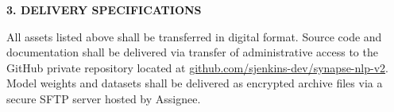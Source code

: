 \vspace{1.5em}

\noindent\textbf{3. DELIVERY SPECIFICATIONS}

All assets listed above shall be transferred in digital format. Source code and documentation shall be delivered via transfer of administrative access to the GitHub private repository located at \url{github.com/sjenkins-dev/synapse-nlp-v2}. Model weights and datasets shall be delivered as encrypted archive files via a secure SFTP server hosted by Assignee.
